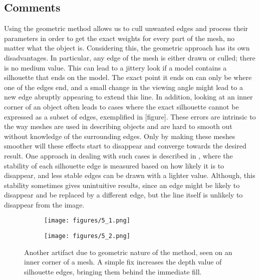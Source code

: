 \documentclass[a4paper, 12pt]{article}
\begin{document}
\subsection{Comments}
Using the geometric method allows us to cull unwanted edges and process their parameters in order to get the exact weights for every part of the mesh, no matter what the object is. Considering this, the geometric approach has its own disadvantages. In particular, any edge of the mesh is either drawn or culled; there is no medium value. This can lead to a jittery look if a model contains a silhouette that ends on the model. The exact point it ends on can only be where one of the edges end, and a small change in the viewing angle might lead to a new edge abruptly appearing to extend this line. In addition, looking at an inner corner of an object often leads to cases where the exact silhouette cannot be expressed as a subset of edges, exemplified in [figure]. These errors are intrinsic to the way meshes are used in describing objects and are hard to smooth out without knowledge of the surrounding edges. Only by making these meshes smoother will these effects start to disappear and converge towards the desired result. One approach in dealing with such cases is described in \cite{Brosz2004}, where the stability of each silhouette edge is measured based on how likely it is to disappear, and less stable edges can be drawn with a lighter value. Although, this stability sometimes gives unintuitive results, since an edge might be likely to disappear and be replaced by a different edge, but the line itself is unlikely to disappear from the image.

\begin{figure}
  \centering
  \begin{subfigure}{0.3\columnwidth}
    \texttt{[image: figures/5\_1.png]}
  \end{subfigure}
  \begin{subfigure}{0.3\columnwidth}
    \texttt{[image: figures/5\_2.png]}
  \end{subfigure}
  \caption{Another artifact due to geometric nature of the method, seen on an inner corner of a mesh. A simple fix increases the depth value of silhouette edges, bringing them behind the immediate fill.}
\end{figure}
\end{document}
